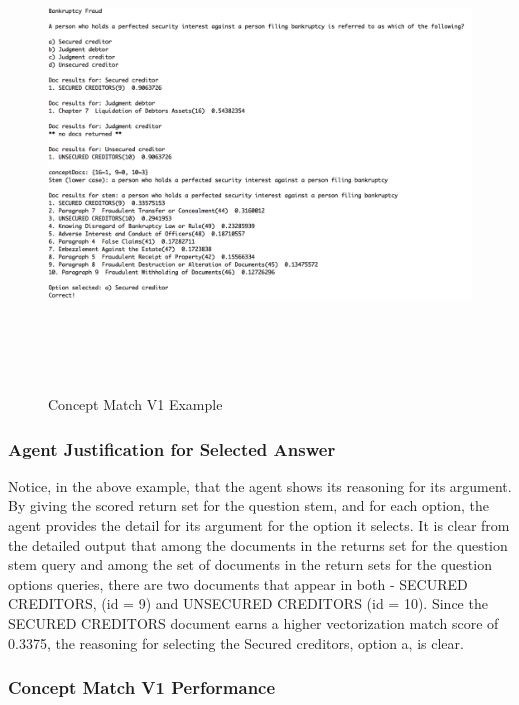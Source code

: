 \begin{figure}
\centering
\vspace{1.0in}
\includegraphics[width=125mm, height=125mm]{concept_match_v1_example.png}
\caption{Concept Match V1 Example}
\label{fig:concept_match_v1_example}
\end{figure}


\subsubsection{Agent Justification for Selected Answer}

Notice, in the above example, that the agent shows its reasoning for its argument.  By giving the scored return set for the question stem, and for each option, the agent provides the detail for its argument for the option it selects.  It is clear from the detailed output that among the documents in the returns set for the question stem query and among the set of documents in the return sets for the question options queries, there are two documents that appear in both - SECURED CREDITORS, (id = 9) and UNSECURED CREDITORS (id = 10).  Since the SECURED CREDITORS document earns a higher vectorization match score of 0.3375, the reasoning for selecting the Secured creditors, option a, is clear.

\subsubsection{Concept Match V1 Performance}

